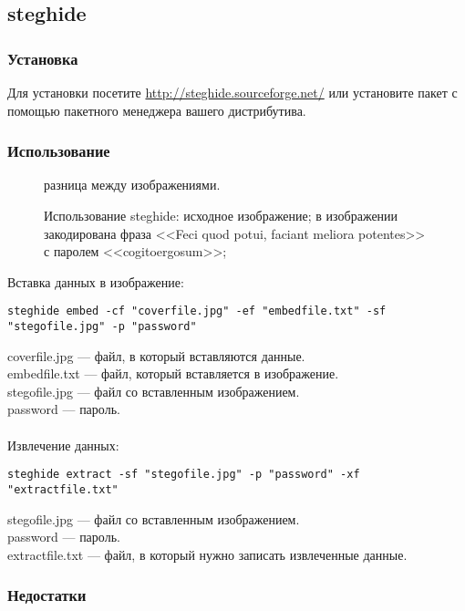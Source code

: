 \subsection{steghide}
\subsubsection{Установка}
Для установки посетите \url{http://steghide.sourceforge.net/} или установите пакет с помощью пакетного менеджера вашего дистрибутива.
\subsubsection{Использование}
\begin{figure}[ht!]
\vspace{-4ex}
\centering
{}
\hspace{4ex}
\hspace{4ex}
\caption{Использование steghide: 
 исходное изображение; 
 в изображении закодирована фраза <<Feci quod potui, faciant meliora potentes>> с паролем <<cogitoergosum>>; 
} разница между изображениями.
\end{figure}
Вставка данных в изображение:
\begin{lstlisting}
steghide embed -cf "coverfile.jpg" -ef "embedfile.txt" -sf "stegofile.jpg" -p "password"
\end{lstlisting}
coverfile.jpg --- файл, в который вставляются данные.\\
embedfile.txt --- файл, который вставляется в изображение.\\
stegofile.jpg --- файл со вставленным изображением.\\
password --- пароль.\\\\
Извлечение данных:
\begin{lstlisting}
steghide extract -sf "stegofile.jpg" -p "password" -xf "extractfile.txt"
\end{lstlisting}
stegofile.jpg --- файл со вставленным изображением.\\
password --- пароль.\\
extractfile.txt --- файл, в который нужно записать извлеченные данные.
\subsubsection{Недостатки}

